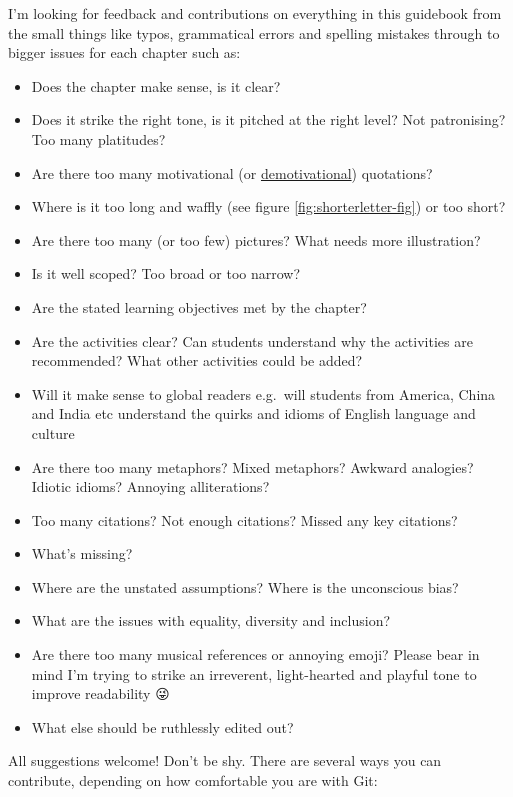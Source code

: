 \documentclass[
]{book}
\providecommand{\tightlist}{%
  \setlength{\itemsep}{0pt}\setlength{\parskip}{0pt}}
\begin{document}
I'm looking for feedback and contributions on everything in this guidebook from the small things like typos, grammatical errors and spelling mistakes through to bigger issues for each chapter such as:

\begin{itemize}
\tightlist
\item
  Does the chapter make sense, is it clear?
\item
  Does it strike the right tone, is it pitched at the right level? Not patronising? Too many platitudes?
\item
  Are there too many motivational (or \href{https://despair.com/collections/demotivators}{demotivational}) quotations?
\item
  Where is it too long and waffly (see figure \ref{fig:shorterletter-fig}) or too short?
\item
  Are there too many (or too few) pictures? What needs more illustration?
\item
  Is it well scoped? Too broad or too narrow?
\item
  Are the stated learning objectives met by the chapter?
\item
  Are the activities clear? Can students understand why the activities are recommended? What other activities could be added?
\item
  Will it make sense to global readers e.g.~will students from America, China and India etc understand the quirks and idioms of English language and culture
\item
  Are there too many metaphors? Mixed metaphors? Awkward analogies? Idiotic idioms? Annoying alliterations?
\item
  Too many citations? Not enough citations? Missed any key citations?
\item
  What's missing?
\item
  Where are the unstated assumptions? Where is the unconscious bias?
\item
  What are the issues with equality, diversity and inclusion?
\item
  Are there too many musical references or annoying emoji? Please bear in mind I'm trying to strike an irreverent, light-hearted and playful tone to improve readability 😜
\item
  What else should be ruthlessly edited out?
\end{itemize}

All suggestions welcome! Don't be shy. There are several ways you can contribute, depending on how comfortable you are with Git:
\end{document}
